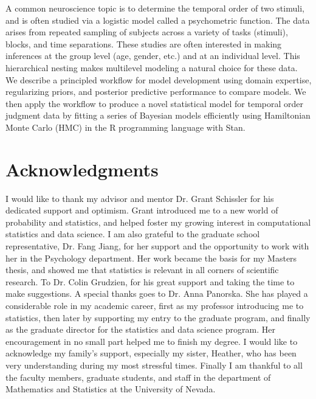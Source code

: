 \documentclass[11pt, oneside, openany]{scrbook}
\begin{document}
A common neuroscience topic is to determine the temporal order of two stimuli, and is often studied via a logistic model called a psychometric function. The data arises from repeated sampling of subjects across a variety of tasks (stimuli), blocks, and time separations. These studies are often interested in making inferences at the group level (age, gender, etc.) and at an individual level. This hierarchical nesting makes multilevel modeling a natural choice for these data. We describe a principled workflow for model development using domain expertise, regularizing priors, and posterior predictive performance to compare models. We then apply the workflow to produce a novel statistical model for temporal order judgment data by fitting a series of Bayesian models efficiently using Hamiltonian Monte Carlo (HMC) in the R programming language with Stan.


\newpage
\section*{Acknowledgments}

I would like to thank my advisor and mentor Dr. Grant Schissler for his dedicated support and optimism. Grant introduced me to a new world of probability and statistics, and helped foster my growing interest in computational statistics and data science. I am also grateful to the graduate school representative, Dr. Fang Jiang, for her support and the opportunity to work with her in the Psychology department. Her work became the basis for my Masters thesis, and showed me that statistics is relevant in all corners of scientific research. To Dr. Colin Grudzien, for his great support and taking the time to make suggestions. A special thanks goes to Dr. Anna Panorska. She has played a considerable role in my academic career, first as my professor introducing me to statistics, then later by supporting my entry to the graduate program, and finally as the graduate director for the statistics and data science program. Her encouragement in no small part helped me to finish my degree. I would like to acknowledge my family's support, especially my sister, Heather, who has been very understanding during my most stressful times. Finally I am thankful to all the faculty members, graduate students, and staff in the department of Mathematics and Statistics at the University of Nevada.


\setcounter{tocdepth}{1}
\tableofcontents
\end{document}
